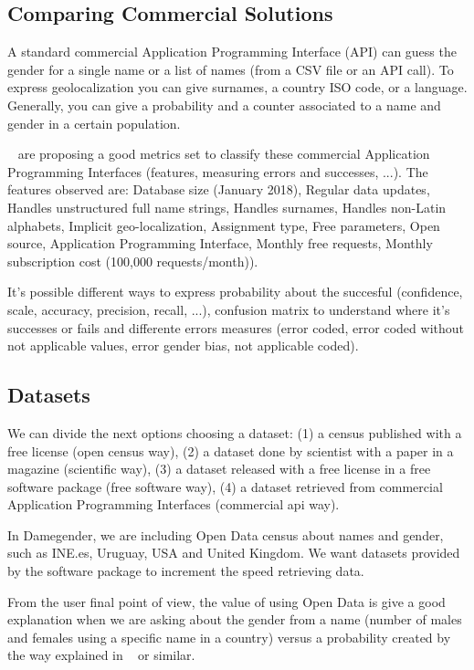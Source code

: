 \documentclass[fleqn,10pt]{wlpeerj} %
\begin{document}
\subsection*{Comparing Commercial Solutions}

A standard commercial Application Programming Interface (API) can
guess the gender for a single name or a list of names (from a CSV file
or an API call). To express geolocalization you can give surnames, a
country ISO code, or a language. Generally, you can give a probability
and a counter associated to a name and gender in a certain population.

~\cite{10.7717/peerj-cs.156} are proposing a good metrics set to
classify these commercial Application Programming Interfaces
(features, measuring errors and successes, ...). The features observed
are: Database size (January 2018), Regular data updates, Handles
unstructured full name strings, Handles surnames, Handles non-Latin
alphabets, Implicit geo-localization, Assignment type, Free
parameters, Open source, Application Programming Interface, Monthly
free requests, Monthly subscription cost (100,000 requests/month)).

It's possible different ways to express probability about the
succesful (confidence, scale, accuracy, precision, recall, ...),
confusion matrix to understand where it's successes or fails and
differente errors measures (error coded, error coded without not
applicable values, error gender bias, not applicable coded).

\subsection*{Datasets}

We can divide the next options choosing a dataset: (1) a census
published with a free license (open census way), (2) a dataset done by
scientist with a paper in a magazine (scientific way), (3) a dataset
released with a free license in a free software package (free software
way), (4) a dataset retrieved from commercial Application Programming
Interfaces (commercial api way).

In Damegender, we are including Open Data census about names and
gender, such as INE.es, Uruguay, USA and United Kingdom. We want
datasets provided by the software package to increment the speed
retrieving data.

From the user final point of view, the value of using Open Data is
give a good explanation when we are asking about the gender from a
name (number of males and females using a specific name in a country)
versus a probability created by the way explained in
~\cite{10.7717/peerj-cs.156} or similar.
\end{document}
